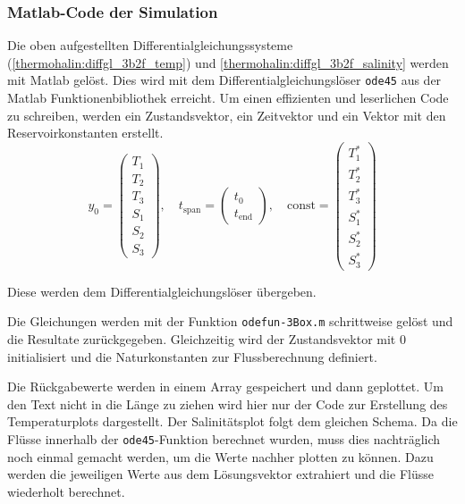 \subsubsection{Matlab-Code der Simulation}

Die oben aufgestellten Differentialgleichungssysteme (\ref{thermohalin:diffgl_3b2f_temp}) und \ref{thermohalin:diffgl_3b2f_salinity} werden mit Matlab gelöst. Dies wird mit dem Differentialgleichungslöser \texttt{ode45} aus der Matlab Funktionenbibliothek erreicht.
Um einen effizienten und leserlichen Code zu schreiben, werden ein Zustandsvektor, ein Zeitvektor und ein Vektor mit den Reservoirkonstanten erstellt.
\begin{equation*}
y_0 = \begin{pmatrix}T_{1} \\ T_{2} \\ T_{3} \\ S_{1} \\ S_{2} \\ S_{3}\end{pmatrix}, \quad
t_{\text{span}} = \begin{pmatrix}t_0 \\ t_{\text{end}} \end{pmatrix}, \quad
\text{const} = \begin{pmatrix}T_{1}^{*} \\ T_{2}^{*} \\ T_{3}^{*} \\ S_{1}^{*} \\ S_{2}^{*} \\ S_{3}^{*}\end{pmatrix}
\end{equation*}




\label{thermohalin:listing:input}
Diese werden dem Differentialgleichungslöser übergeben.
\label{thermohalin:listing:uebergabe}

Die Gleichungen werden mit der Funktion \texttt{odefun-3Box.m} schrittweise gelöst und die Resultate zurückgegeben. Gleichzeitig wird der Zustandsvektor mit $0$ initialisiert und die Naturkonstanten zur Flussberechnung definiert.

\label{thermohalin:listing:solve}

Die Rückgabewerte werden in einem Array gespeichert und dann geplottet. Um den Text nicht in die Länge zu ziehen wird hier nur der Code zur Erstellung des Temperaturplots dargestellt. Der Salinitätsplot folgt dem gleichen Schema.
Da die Flüsse innerhalb der \texttt{ode45}-Funktion berechnet wurden, muss dies nachträglich noch einmal gemacht werden, um die Werte nachher plotten zu können. Dazu werden die jeweiligen Werte aus dem Lösungsvektor extrahiert und die Flüsse wiederholt berechnet.
\label{thermohalin:listing:plot}

